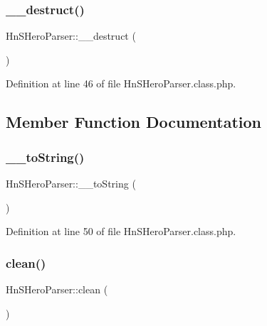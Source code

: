 \subsubsection{\texorpdfstring{\+\_\+\+\_\+destruct()}{\_\_destruct()}}
{\footnotesize\ttfamily Hn\+S\+Hero\+Parser\+::\+\_\+\+\_\+destruct (\begin{DoxyParamCaption}{ }\end{DoxyParamCaption})}



Definition at line 46 of file Hn\+S\+Hero\+Parser.\+class.\+php.



\subsection{Member Function Documentation}
\mbox{\label{class_hn_s_hero_parser_a6f55841b332636c1abc3894a326b3181}} 
\subsubsection{\texorpdfstring{\+\_\+\+\_\+to\+String()}{\_\_toString()}}
{\footnotesize\ttfamily Hn\+S\+Hero\+Parser\+::\+\_\+\+\_\+to\+String (\begin{DoxyParamCaption}{ }\end{DoxyParamCaption})}



Definition at line 50 of file Hn\+S\+Hero\+Parser.\+class.\+php.

\mbox{\label{class_hn_s_hero_parser_aac2dc1befb5a88823cb1fdacaa170448}} 
\subsubsection{\texorpdfstring{clean()}{clean()}}
{\footnotesize\ttfamily Hn\+S\+Hero\+Parser\+::clean (\begin{DoxyParamCaption}{ }\end{DoxyParamCaption})\hspace{0.3cm}{\ttfamily [private]}}




